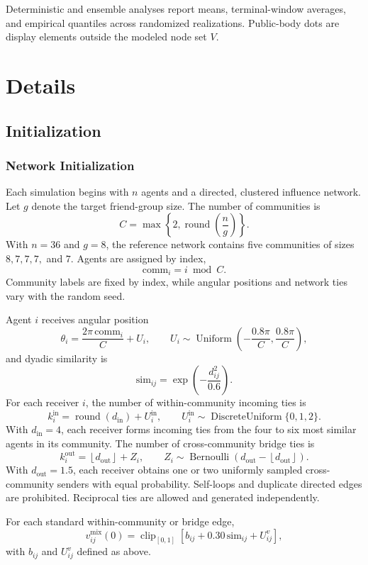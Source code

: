 \documentclass[11pt]{article}
\begin{document}
Deterministic and ensemble analyses report means, terminal-window averages, and empirical quantiles across randomized realizations. Public-body dots are display elements outside the modeled node set $V$.

\section{Details}
\subsection{Initialization}
\subsubsection{Network Initialization}
Each simulation begins with \(n\) agents and a directed, clustered influence network. Let \(g\) denote the target friend-group size. The number of communities is
\[
C=\max\left\{2,\operatorname{round}\left(\frac{n}{g}\right)\right\}.
\]
With \(n=36\) and \(g=8\), the reference network contains five communities of sizes \(8,7,7,7,\) and \(7\). Agents are assigned by index,
\[
\mathrm{comm}_i=i\bmod C.
\]
Community labels are fixed by index, while angular positions and network ties vary with the random seed.

Agent \(i\) receives angular position
\[
\theta_i
=
\frac{2\pi\,\mathrm{comm}_i}{C}+U_i,
\qquad
U_i\sim
\operatorname{Uniform}\left(
-\frac{0.8\pi}{C},
\frac{0.8\pi}{C}
\right),
\]
and dyadic similarity is
\[
\mathrm{sim}_{ij}
=
\exp\left(
-\frac{d_{ij}^{2}}{0.6}
\right).
\]
For each receiver \(i\), the number of within-community incoming ties is
\[
k_i^{\mathrm{in}}
=
\operatorname{round}(d_{\mathrm{in}})+U_i^{\mathrm{in}},
\qquad
U_i^{\mathrm{in}}
\sim
\operatorname{DiscreteUniform}\{0,1,2\}.
\]
With \(d_{\mathrm{in}}=4\), each receiver forms incoming ties from the four to
six most similar agents in its community. The number of cross-community bridge ties is
\[
k_i^{\mathrm{out}}
=
\left\lfloor d_{\mathrm{out}}\right\rfloor+Z_i,
\qquad
Z_i\sim
\operatorname{Bernoulli}\left(
d_{\mathrm{out}}-\left\lfloor d_{\mathrm{out}}\right\rfloor
\right).
\]
With \(d_{\mathrm{out}}=1.5\), each receiver obtains one or two uniformly
sampled cross-community senders with equal probability. Self-loops and duplicate directed edges are prohibited. Reciprocal ties are allowed and generated independently.

For each standard within-community or bridge edge,
\[
v_{ij}^{\mathrm{mix}}(0)
=
\operatorname{clip}_{[0,1]}
\left[
b_{ij}
+
0.30\,\mathrm{sim}_{ij}
+
U_{ij}^{v}
\right],
\]
with \(b_{ij}\) and \(U_{ij}^{v}\) defined as above.
\end{document}
